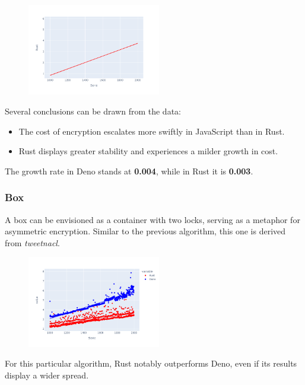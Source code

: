 \documentclass[10pt,journal,compsoc]{IEEEtran}
\begin{document}
\begin{figure}[H]
    \centering
    \includegraphics[width=0.52\textwidth]{images/trend_secretbox_rust}
\end{figure}

Several conclusions can be drawn from the data:
\begin{itemize}
    \item The cost of encryption escalates more swiftly in JavaScript than in Rust.
    \item Rust displays greater stability and experiences a milder growth in cost.
\end{itemize}

The growth rate in Deno stands at \textbf{0.004}, while in Rust it is \textbf{0.003}.

\subsubsection{Box}

A box can be envisioned as a container with two locks, serving as a metaphor for asymmetric encryption. Similar to the previous algorithm, this one is derived from \textit{tweetnacl}.

\begin{figure}[H]
    \centering
    \includegraphics[width=0.52\textwidth]{images/box_lines}
\end{figure}

For this particular algorithm, Rust notably outperforms Deno, even if its results display a wider spread.
\end{document}
